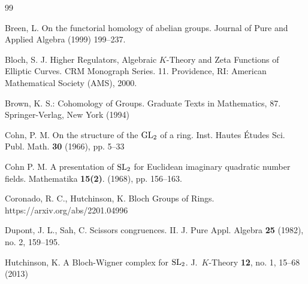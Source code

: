 \documentclass[11pt]{amsart}
\theoremstyle{definition}
\theoremstyle{plain}
\theoremstyle{definition}
\numberwithin{equation}{section}
\newcommand{\z}{\mathbb{Z}}
\newcommand{\GL}{\mathit{{\rm GL}}}
\newcommand{\SL}{\mathit{{\rm SL}}}
\begin{document}
	\begin{thebibliography}{99}
		
		
		Breen, L. On the functorial homology of abelian groups. 
		Journal of Pure and Applied Algebra {} (1999) 199--237.
		
		Bloch, S. J. Higher Regulators, Algebraic $K$-Theory and Zeta Functions of Elliptic Curves. 
		CRM Monograph Series. 11. Providence, RI: American Mathematical Society (AMS), 2000.
		
		Brown, K. S.: Cohomology of Groups. Graduate Texts in Mathematics, 87. Springer-Verlag, New York (1994)
		
		Cohn, P. M. On the structure of the $\GL_2$ of a ring. Inst. Hautes \'Etudes Sci. Publ. Math. {\bf 30} (1966), pp. 5--33
		
		Cohn P. M. A presentation of $\SL_2$ for Euclidean imaginary quadratic number fields. Mathematika {\bf 15(2)}. (1968), pp. 156--163.
		
		Coronado, R. C.,  Hutchinson, K. Bloch Groups of Rings. https://arxiv.org/abs/2201.04996
		
		Dupont, J. L., Sah, C. Scissors congruences. II. J. Pure Appl. Algebra  {\bf 25}  (1982), no. 2, 159--195.
		
		
		
		Hutchinson, K. A Bloch-Wigner complex for $\SL_2$. J.~$K$-Theory {\bf 12}, no. 1, 15--68 (2013)
		
		

\end{thebibliography}
\end{document}

